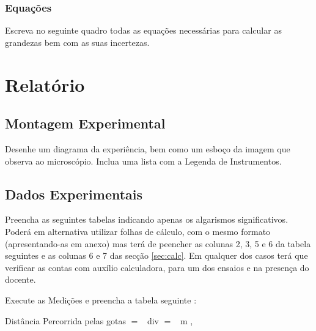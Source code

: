 \documentclass[a4paper,12pt]{article}  %
\begin{document}
\subsubsection{\sf Equações }
Escreva no seguinte quadro todas as equações necessárias para calcular as grandezas bem com as suas incertezas.
\begin{center}
\framebox[15cm]{\rule{0pt}{6.5cm}}
\end{center}


\section{\sf Relatório}
\subsection{\sf Montagem Experimental}
Desenhe um diagrama da experiência, bem como um esboço da imagem que observa ao microscópio. Inclua uma lista com a Legenda de Instrumentos.

\begin{center}
\framebox[18cm]{\rule{0pt}{6.5cm}}
\end{center}

\subsection{\sf Dados Experimentais}\label{sec:dados}
Preencha as seguintes tabelas indicando  apenas os algarismos significativos. Poderá em alternativa utilizar folhas de cálculo, com o mesmo formato (apresentando-as em anexo) mas terá de peencher as colunas 2, 3, 5 e 6 da tabela seguintes e as colunas 6 e 7 das secção \ref{sec:calc}. Em qualquer dos casos terá que verificar as contas com auxílio calculadora, para um dos ensaios e na presença do docente.

 Execute as Medições e preencha a tabela seguinte :

\noindent  Distância Percorrida pelas gotas $=$~\underline{\makebox[1cm][r]{~}} div $=$~\underline{\makebox[1cm][r]{~}} m , 
\end{document}
